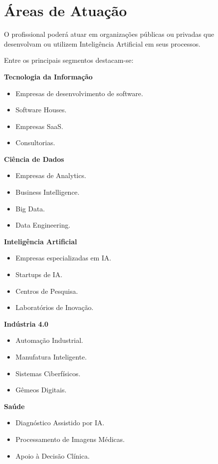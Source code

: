 \chapter{Áreas de Atuação}

O profissional poderá atuar em organizações públicas ou privadas que desenvolvam ou utilizem Inteligência Artificial em seus processos.

Entre os principais segmentos destacam-se:

\textbf{Tecnologia da Informação}
\begin{itemize}
    \item Empresas de desenvolvimento de software.
    \item Software Houses.
    \item Empresas SaaS.
    \item Consultorias.
\end{itemize}

\textbf{Ciência de Dados}
\begin{itemize}
    \item Empresas de Analytics.
    \item Business Intelligence.
    \item Big Data.
    \item Data Engineering.
\end{itemize}

\textbf{Inteligência Artificial}
\begin{itemize}
    \item Empresas especializadas em IA.
    \item Startups de IA.
    \item Centros de Pesquisa.
    \item Laboratórios de Inovação.
\end{itemize}

\textbf{Indústria 4.0}
\begin{itemize}
    \item Automação Industrial.
    \item Manufatura Inteligente.
    \item Sistemas Ciberfísicos.
    \item Gêmeos Digitais.
\end{itemize}

\textbf{Saúde}
\begin{itemize}
    \item Diagnóstico Assistido por IA.
    \item Processamento de Imagens Médicas.
    \item Apoio à Decisão Clínica.
\end{itemize}

